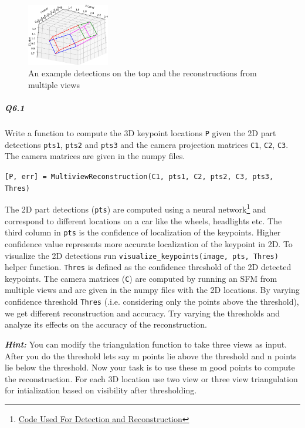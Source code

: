 \begin{figure}[t]
    \includegraphics[width=0.32\textwidth]{images/q6/time4_recon_3.png}
    \caption{An example detections on the top and the reconstructions from multiple views}
    \label{fig:q6}
\end{figure}

\subparagraph*{Q6.1}
Write a function to compute the 3D keypoint locations \texttt{P} given the 2D part detections \texttt{pts1}, \texttt{pts2} and \texttt{pts3} and the camera projection matrices \texttt{C1}, \texttt{C2}, \texttt{C3}. The camera matrices are given in the numpy files. 

\begin{center}
\texttt{[P, err] = MultiviewReconstruction(C1, pts1, C2, pts2, C3, pts3, Thres)}
\end{center}

The 2D part detections (\texttt{pts}) are computed using a neural network\footnote{\href{http://www.cs.cmu.edu/~ILIM/projects/IM/CarFusion/cvpr2018/index.html}{Code Used For Detection and Reconstruction}} and correspond to different locations on a car like the wheels, headlights etc. The third column in \texttt{pts} is the confidence of localization of the keypoints. Higher confidence value represents more accurate localization of the keypoint in 2D. To visualize the 2D detections run \texttt{visualize\_keypoints(image, pts, Thres)} helper function. \texttt{Thres} is defined as the confidence threshold of the 2D detected keypoints. The camera matrices (\texttt{C}) are computed by running an SFM from multiple views and are given in the numpy files with the 2D locations. By varying confidence threshold \texttt{Thres} (.i.e. considering only the points above the threshold), we get different reconstruction and accuracy. Try varying the thresholds and analyze its effects on the accuracy of the reconstruction.  

\textbf{\textit{Hint:}} You can modify the triangulation function to take three views as input. After you do the threshold lets say m points lie above the threshold and n points lie below the threshold. Now your task is to use these m good points to compute the reconstruction. For each 3D location use two view or three view triangulation for intialization based on visibility after thresholding. 

